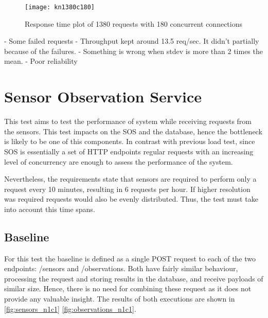 \begin{sidewaysfigure}[h]
	\centering
	\texttt{[image: kn1380c180]}
	\caption{Response time plot of 1380 requests with 180 concurrent connections}
	\label{fig:kn2300c300_chart}
\end{sidewaysfigure}

- Some failed requests
- Throughput kept around 13.5 req/sec. It didn't partially because of the failures.
- Something is wrong when stdev is more than 2 times the mean.
- Poor reliability

\section{Sensor Observation Service}

This test aims to test the performance of system while receiving requests from the sensors. This test impacts on the SOS and the database, hence the bottleneck is likely to be one of this components. In contrast with previous load test, since SOS is essentially a set of HTTP endpoints regular requests with an increasing level of concurrency are enough to assess the performance of the system.

Nevertheless, the requirements state that sensors are required to perform only a request every 10 minutes, resulting in 6 requests per hour. If higher resolution was required requests would also be evenly distributed. Thus, the test must take into account this time spans.

\subsection{Baseline}

For this test the baseline is defined as a single POST request to each of the two endpoints: /sensors and /observations. Both have fairly similar behaviour, processing the request and storing results in the database, and receive payloads of similar size. Hence, there is no need for combining these request as it does not provide any valuable insight. The results of both executions are shown in \ref{fig:sensors_n1c1} \ref{fig:observations_n1c1}.

